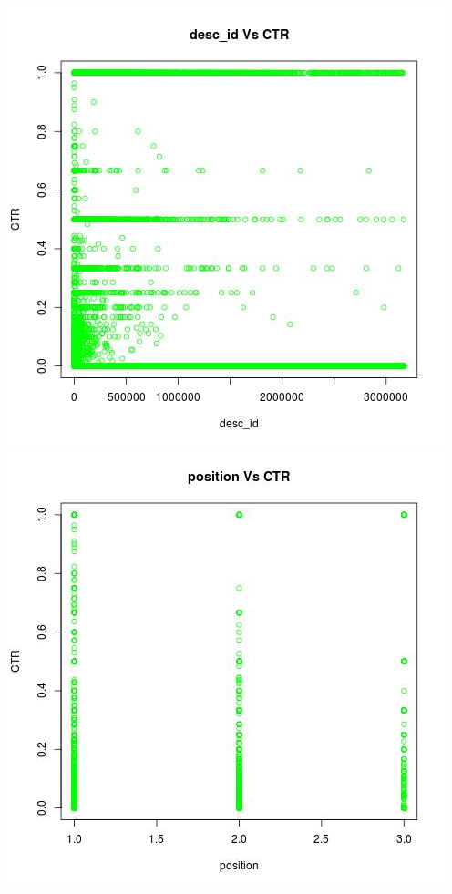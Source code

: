 \documentclass[10pt]{article}
\begin{document}
\includegraphics[scale=0.5]{desc_id_Vs_CTR}
\includegraphics[scale=0.5]{position_Vs_CTR}\\\\
\end{document}
